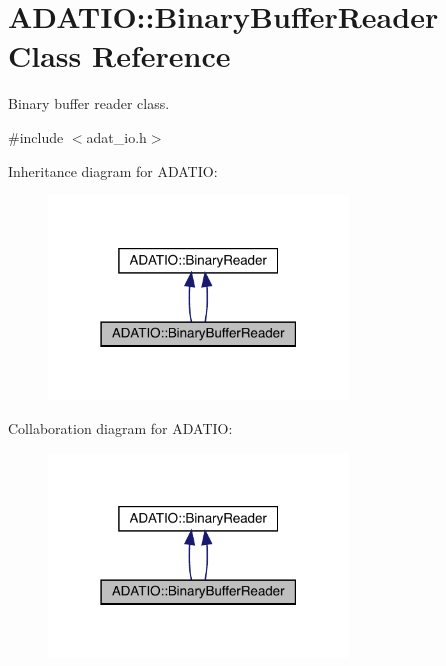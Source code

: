 \hypertarget{classADATIO_1_1BinaryBufferReader}{}\section{A\+D\+A\+T\+IO\+:\+:Binary\+Buffer\+Reader Class Reference}
\label{classADATIO_1_1BinaryBufferReader}


Binary buffer reader class.  




{\ttfamily \#include $<$adat\+\_\+io.\+h$>$}



Inheritance diagram for A\+D\+A\+T\+IO\+:\nopagebreak
\begin{figure}[H]
\begin{center}
\leavevmode
\includegraphics[width=226pt]{d5/d74/classADATIO_1_1BinaryBufferReader__inherit__graph}
\end{center}
\end{figure}


Collaboration diagram for A\+D\+A\+T\+IO\+:\nopagebreak
\begin{figure}[H]
\begin{center}
\leavevmode
\includegraphics[width=226pt]{da/db1/classADATIO_1_1BinaryBufferReader__coll__graph}
\end{center}
\end{figure}
